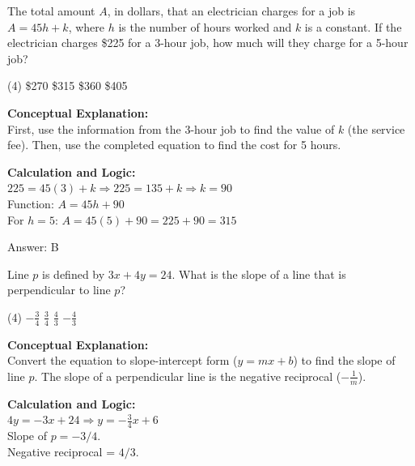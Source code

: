 \documentclass[11pt,paper=a4,answers]{exam}
\begin{document}
\begin{questions}
\vspace{20pt}

\question
The total amount $A$, in dollars, that an electrician charges for a job is $A = 45h + k$, where $h$ is the number of hours worked and $k$ is a constant. If the electrician charges \$225 for a 3-hour job, how much will they charge for a 5-hour job?
\begin{tasks}(4)
    \task \$270
    \task \$315
    \task \$360
    \task \$405
\end{tasks}

\begin{solution}
\textbf{Conceptual Explanation:} \\
First, use the information from the 3-hour job to find the value of $k$ (the service fee). Then, use the completed equation to find the cost for 5 hours.

\vspace{10pt}
\textbf{Calculation and Logic:} \\
$225 = 45(3) + k \Rightarrow 225 = 135 + k \Rightarrow k = 90$ \\
Function: $A = 45h + 90$ \\
For $h = 5$: $A = 45(5) + 90 = 225 + 90 = 315$

\vspace{15pt}
Answer: \colorbox{yellow!100}{B}
\end{solution}

\vspace{20pt}

\question
Line $p$ is defined by $3x + 4y = 24$. What is the slope of a line that is perpendicular to line $p$?
\begin{tasks}(4)
    \task $-\frac{3}{4}$
    \task $\frac{3}{4}$
    \task $\frac{4}{3}$
    \task $-\frac{4}{3}$
\end{tasks}

\begin{solution}
\textbf{Conceptual Explanation:} \\
Convert the equation to slope-intercept form ($y = mx + b$) to find the slope of line $p$. The slope of a perpendicular line is the negative reciprocal ($-\frac{1}{m}$).

\vspace{10pt}
\textbf{Calculation and Logic:} \\
$4y = -3x + 24 \Rightarrow y = -\frac{3}{4}x + 6$ \\
Slope of $p = -3/4$. \\
Negative reciprocal = $4/3$.


\end{solution}
\end{questions}
\end{document}
